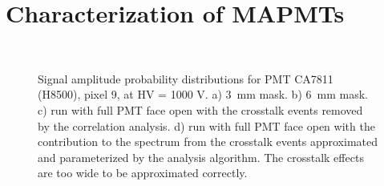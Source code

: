 \section{Characterization of MAPMTs}

\begin{figure}[hbt] 
\centering 
   \\
  \caption{Signal amplitude probability distributions for PMT CA7811 (H8500), pixel 9, at HV = 1000 V. a) 3~mm mask. b) 6~mm mask. c) run with full PMT face open with the crosstalk events removed by the correlation analysis. d) run with full PMT face open with the contribution to the spectrum from the crosstalk events approximated and parameterized by the analysis algorithm. The crosstalk effects are too wide to be approximated correctly.
    }
\label{fig:CA7811}
\end{figure}

